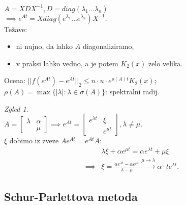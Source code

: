 \documentclass[a4paper, 12pt]{book}
\theoremstyle{definition}
\theoremstyle{remark}
\newtheorem*{exmp}{Zgled}
\begin{document}
$A = X D X^{-1}, D = diag(\lambda_1 \dots \lambda_n)$ \\
$\implies e^{At} = X diag\left(e^{\lambda_1} \dots e^{\lambda_n}\right) X^{-1}$. \\
Težave:
\begin{itemize}
    \item ni nujno, da lahko $A$ diagonaliziramo,
    \item v praksi lahko vedno, a je potem $K_2(x)$ zelo velika.
\end{itemize}
Ocena: $|| f(e^{At}) - e^{At}||_2 \leq n \cdot u \cdot e^{\rho(A) t} K_2(x)$; \\
$\rho(A) = \max \{|\lambda|: \lambda \in \sigma(A)\}$: spektralni radij.
\begin{exmp} \text{} \\
    $A = \begin{bmatrix} \lambda & \alpha \\ & \mu \end{bmatrix}
    \implies e^{At} = \begin{bmatrix} e^{\lambda t} & \xi \\ & e^{\mu t}\end{bmatrix}, \lambda \neq \mu$. \\
    $\xi$ dobimo iz zveze $A e^{At} = e^{At} A:$
    \begin{align*}
        &\lambda \xi + \alpha e^{\mu t} = \alpha e^{\lambda t} + \mu \xi \\
        \implies &\xi = \frac{\alpha e^{\lambda t} - \alpha e^{\mu t}}{\lambda - \mu}
        \stackrel{\mu \to \lambda}{\longrightarrow} \alpha \cdot t e^{\lambda t}.
    \end{align*}
\end{exmp}

\subsection{Schur-Parlettova metoda}
\end{document}
